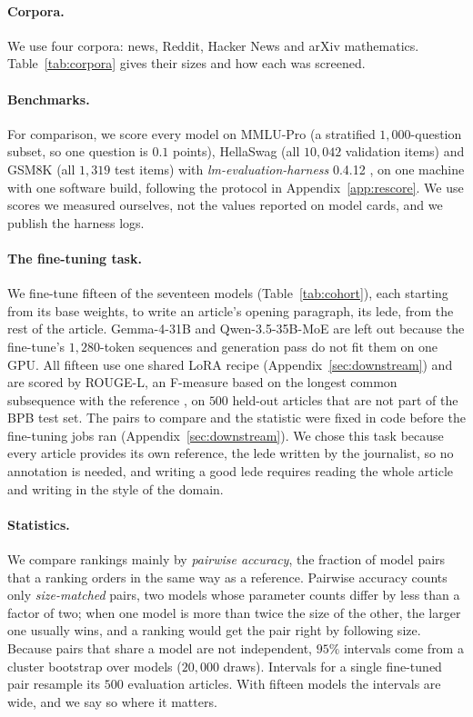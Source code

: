 \documentclass[10pt]{article}
\begin{document}
\paragraph{Corpora.} We use four corpora: news, Reddit, Hacker News and arXiv mathematics.
Table~\ref{tab:corpora} gives their sizes and how each was screened.

\paragraph{Benchmarks.} For comparison, we score every model on MMLU-Pro (a stratified
$1{,}000$-question subset, so one question is $0.1$ points), HellaSwag (all $10{,}042$ validation
items) and GSM8K (all $1{,}319$ test items) with \emph{lm-evaluation-harness} 0.4.12
\citep{gao2024lmeval}, on one machine with one software build, following the protocol in
Appendix~\ref{app:rescore}. We use scores we measured ourselves, not the values reported on model
cards, and we publish the harness logs.

\paragraph{The fine-tuning task.} We fine-tune fifteen of the seventeen models
(Table~\ref{tab:cohort}), each starting from its base weights, to write an article's opening
paragraph, its lede, from the rest of the article. Gemma-4-31B and Qwen-3.5-35B-MoE are left out
because the fine-tune's $1{,}280$-token sequences and generation pass do not fit them on one GPU.
All fifteen use one shared LoRA recipe (Appendix~\ref{sec:downstream}) and are scored by ROUGE-L, an F-measure based
on the longest common subsequence with the reference \citep{lin2004rouge}, on $500$ held-out
articles that are not part of the BPB test set. The pairs to compare and the statistic were fixed
in code before the fine-tuning jobs ran (Appendix~\ref{sec:downstream}). We chose this task because
every article provides its own reference, the lede written by the journalist, so no annotation is
needed, and writing a good lede requires reading the whole article and writing in the style of the
domain.

\paragraph{Statistics.} We compare rankings mainly by \emph{pairwise accuracy}, the fraction of
model pairs that a ranking orders in the same way as a reference. Pairwise accuracy counts only
\emph{size-matched} pairs, two models whose parameter counts differ by less than a factor of two;
when one model is more than twice the size of the other, the larger one usually wins, and a ranking
would get the pair right by following size. Because pairs that share a model are not independent,
$95\%$ intervals come from a cluster bootstrap over models ($20{,}000$ draws). Intervals for a single
fine-tuned pair resample its $500$ evaluation articles. With fifteen models the intervals are wide,
and we say so where it matters.
\end{document}
